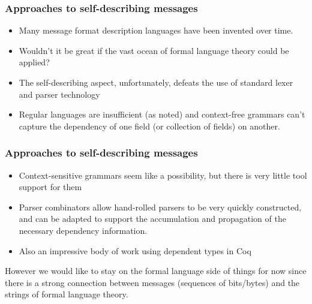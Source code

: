 \documentclass{beamer}
\begin{document}
\begin{frame}\frametitle{Approaches to self-describing messages}

\begin{itemize}

\item Many message format description languages have been invented over time.

\item Wouldn't it be great if the vast ocean of formal language theory could be applied?

\item The self-describing aspect, unfortunately, defeats the use of
  standard lexer and parser technology

\item Regular languages are insufficient (as noted) and context-free
  grammars can’t capture the dependency of one field (or collection of
  fields) on another.

\end{itemize}
\end{frame}

\begin{frame}\frametitle{Approaches to self-describing messages}
\begin{itemize}

\item Context-sensitive grammars seem like a possibility, but there is
  very little tool support for them

\item Parser combinators allow  hand-rolled parsers to be very quickly
  constructed, and can be adapted to support the accumulation and
  propagation of the necessary dependency information.

\item Also an impressive body of work using dependent types in Coq

\end{itemize}

However we would like to stay on the formal language side of things
for now since there is a strong connection between messages (sequences
of bits/bytes) and the strings of formal language theory.

\end{frame}
\end{document}
